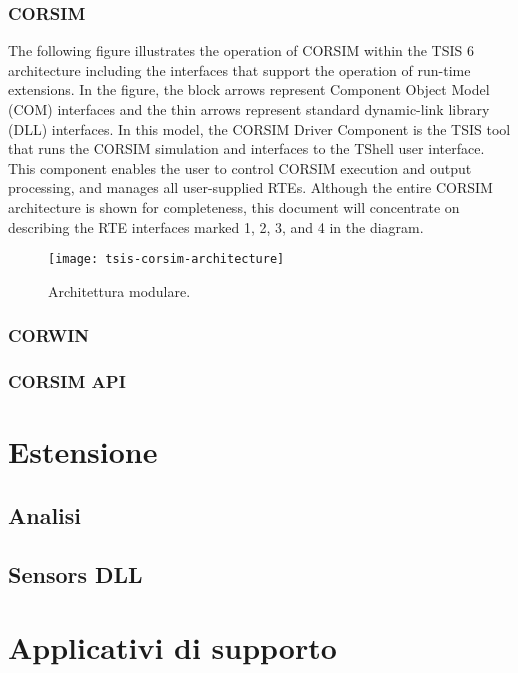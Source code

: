 \subsubsection{CORSIM}
The following figure illustrates the operation of CORSIM within the TSIS 6 architecture including the interfaces
that support the operation of run-time extensions. In the figure, the block arrows represent Component Object
Model (COM) interfaces and the thin arrows represent standard dynamic-link library (DLL) interfaces. In this
model, the CORSIM Driver Component is the TSIS tool that runs the CORSIM simulation and interfaces to the
TShell user interface. This component enables the user to control CORSIM execution and output processing, and
manages all user-supplied RTEs. Although the entire CORSIM architecture is shown for completeness, this
document will concentrate on describing the RTE interfaces marked 1, 2, 3, and 4 in the diagram.

\begin{figure}
\centering
\texttt{[image: tsis-corsim-architecture]}
\caption[L'architettura di \acs{CORSIM}]{Architettura modulare.}
\label{fig:tsis-corsim-arch}
\end{figure}


\subsubsection{CORWIN}

\subsubsection{CORSIM API}

\section{Estensione}

\subsection{Analisi}

\subsection{Sensors DLL}

\section{Applicativi di supporto}
